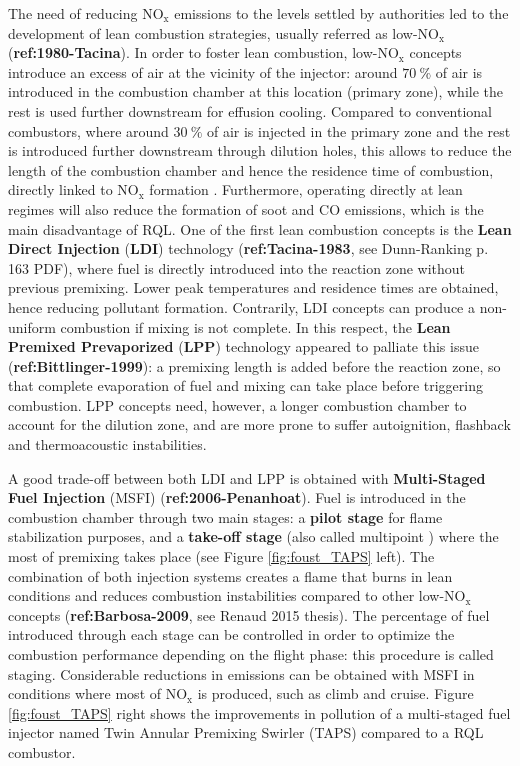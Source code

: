 The need of reducing NO$_\mathrm{x}$ emissions to the levels settled by authorities led to the development of lean combustion strategies, usually referred as low-NO$_\mathrm{x}$ (\textbf{ref:1980-Tacina}). In order to foster lean combustion, low-NO$_\mathrm{x}$ concepts introduce an excess of air at the vicinity of the injector: around $70 ~\%$ of air is introduced in the combustion chamber at this location (primary zone), while the rest is used further downstream for effusion cooling. Compared to conventional combustors, where around $30 ~\%$ of air is injected in the primary zone and the rest is introduced further downstream through dilution holes, this allows to reduce the length of the combustion chamber and hence the residence time of combustion, directly linked to NO$_\mathrm{x}$ formation . Furthermore, operating directly at lean regimes will also reduce the formation of soot and CO emissions, which is the main disadvantage of RQL. One of the first lean combustion concepts is the \textbf{Lean Direct Injection} (\textbf{LDI}) technology (\textbf{ref:Tacina-1983}, see Dunn-Ranking p. 163 PDF), where fuel is directly introduced into the reaction zone without previous premixing. Lower peak temperatures and residence times are obtained, hence reducing pollutant formation. Contrarily, LDI concepts can produce a non-uniform combustion if mixing is not complete. In this respect, the \textbf{Lean Premixed Prevaporized} (\textbf{LPP}) technology appeared to palliate this issue (\textbf{ref:Bittlinger-1999}): a premixing length is added before the reaction zone, so that complete evaporation of fuel and mixing can take place before triggering combustion. LPP concepts need, however, a longer combustion chamber to account for the dilution zone, and are more prone to suffer autoignition, flashback and thermoacoustic instabilities.

A good trade-off between both LDI and LPP is obtained with \textbf{Multi-Staged Fuel Injection} (MSFI) (\textbf{ref:2006-Penanhoat}). Fuel is introduced in the combustion chamber through two main stages: a \textbf{pilot stage} for flame stabilization purposes, and a \textbf{take-off stage} (also called multipoint ) where the most of premixing takes place (see Figure \ref{fig:foust_TAPS} left). The combination of both injection systems creates a flame that burns in lean conditions and reduces combustion instabilities compared to other low-NO$_\mathrm{x}$ concepts (\textbf{ref:Barbosa-2009}, see Renaud 2015 thesis). The percentage of fuel introduced through each stage can be controlled in order to optimize the combustion performance depending on the flight phase: this procedure is called staging. Considerable reductions in emissions can be obtained with MSFI in conditions where most of NO$_\mathrm{x}$ is produced, such as climb and cruise. Figure \ref{fig:foust_TAPS} right shows the improvements in pollution of a multi-staged fuel injector named Twin Annular Premixing Swirler (TAPS)  compared to a RQL combustor.

